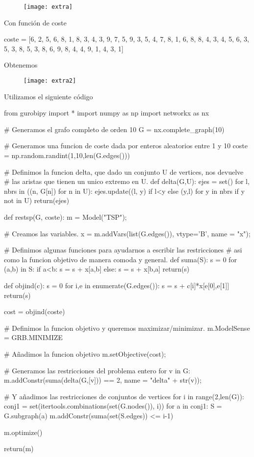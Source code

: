 \documentclass[twoside]{article}
\begin{document}
\begin{figure}[h!]
\centering
\texttt{[image: extra]}
\end{figure}
Con función de coste 
\begin{pythone}
coste = [6, 2, 5, 6, 8, 1, 8, 3, 4, 3, 9, 7, 5, 9, 3, 5, 4, 7, 8, 1, 6, 8, 8, 4, 3, 4, 5, 6, 3, 5, 3, 8, 5, 3, 8, 6, 9, 8, 4, 4, 9, 1, 4, 3, 1]
\end{pythone}
Obtenemos
\begin{figure}[h!]
\centering
\texttt{[image: extra2]}
\end{figure}
\newpage
Utilizamos el siguiente código
\begin{pythone}

from gurobipy import *
import numpy as np
import networkx as nx

# Generamos el grafo completo de orden 10
G = nx.complete_graph(10)

# Generamos una funcion de coste dada por enteros aleatorios entre 1 y 10
coste = np.random.randint(1,10,len(G.edges()))


# Definimos la funcion delta, que dado un conjunto U de vertices, nos devuelve
# las aristas que tienen un unico extremo en U.
def delta(G,U):
    ejes = set()
    for l, nbrs in ((n, G[n]) for n in U):
        ejes.update((l, y) if l<y else (y,l) for y in nbrs if y not in U)
    return(ejes)
    

def restsp(G, coste):
    m = Model("TSP");
    
    # Creamos las variables.
    x = m.addVars(list(G.edges()), vtype='B', name = "x");
    
    # Definimos algunas funciones para ayudarnos a escribir las restricciones
    # asi como la funcion objetivo de manera comoda y general.
    def suma(S):
        s = 0
        for (a,b) in S:
            if a<b:
                s = s + x[a,b]
            else:
                s = s + x[b,a]
        return(s)
        
    def objind(c):
        s = 0
        for i,e in enumerate(G.edges()):
            s = s + c[i]*x[e[0],e[1]] 
        return(s)
        
    cost = objind(coste)
    
    # Definimos la funcion objetivo y queremos maximizar/minimizar.
    m.ModelSense = GRB.MINIMIZE
    
    # Añadimos la funcion objetivo
    m.setObjective(cost); 
    
    # Generamos las restricciones del problema entero
    for v in G:
            m.addConstr(suma(delta(G,[v])) == 2, name = "delta" + str(v));

    # Y añadimos las restricciones de conjuntos de vertices
    for i in range(2,len(G)):
        conj1 = set(itertools.combinations(set(G.nodes()), i))
        for a in conj1:
            S = G.subgraph(a)
            m.addConstr(suma(set(S.edges)) <= i-1)
    
    m.optimize()
    
    return(m)
\end{pythone}
\end{document}
